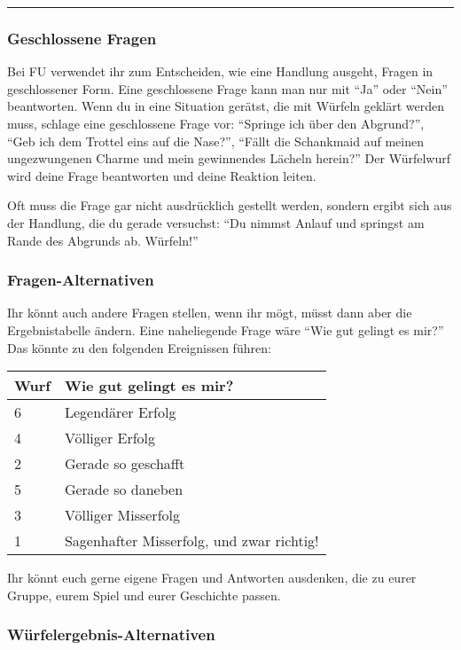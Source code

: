 \documentclass[]{article}
\begin{document}
\textbar{}

\begin{center}\rule{0.5\linewidth}{\linethickness}\end{center}

\subsubsection{Geschlossene Fragen}\label{geschlossene-fragen}

Bei FU verwendet ihr zum Entscheiden, wie eine Handlung ausgeht, Fragen
in geschlossener Form. Eine geschlossene Frage kann man nur mit ``Ja''
oder ``Nein'' beantworten. Wenn du in eine Situation gerätst, die mit
Würfeln geklärt werden muss, schlage eine geschlossene Frage vor:
``Springe ich über den Abgrund?'', ``Geb ich dem Trottel eins auf die
Nase?'', ``Fällt die Schankmaid auf meinen ungezwungenen Charme und mein
gewinnendes Lächeln herein?'' Der Würfelwurf wird deine Frage
beantworten und deine Reaktion leiten.

Oft muss die Frage gar nicht ausdrücklich gestellt werden, sondern
ergibt sich aus der Handlung, die du gerade versuchst: ``Du nimmst
Anlauf und springst am Rande des Abgrunds ab. Würfeln!''

\subsubsection{Fragen-Alternativen}\label{fragen-alternativen}

Ihr könnt auch andere Fragen stellen, wenn ihr mögt, müsst dann aber die
Ergebnistabelle ändern. Eine naheliegende Frage wäre ``Wie gut gelingt
es mir?'' Das könnte zu den folgenden Ereignissen führen:

\begin{longtable}[]{@{}ll@{}}
\toprule
Wurf & Wie gut gelingt es mir?\tabularnewline
\midrule
\endhead
6 & Legendärer Erfolg\tabularnewline
4 & Völliger Erfolg\tabularnewline
2 & Gerade so geschafft\tabularnewline
5 & Gerade so daneben\tabularnewline
3 & Völliger Misserfolg\tabularnewline
1 & Sagenhafter Misserfolg, und zwar richtig!\tabularnewline
\bottomrule
\end{longtable}

Ihr könnt euch gerne eigene Fragen und Antworten ausdenken, die zu eurer
Gruppe, eurem Spiel und eurer Geschichte passen.

\subsubsection{Würfelergebnis-Alternativen}\label{wuxfcrfelergebnis-alternativen}
\end{document}
